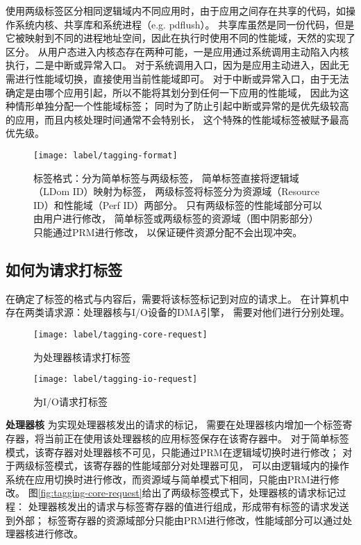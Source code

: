使用两级标签区分相同逻辑域内不同应用时，由于应用之间存在共享的代码，如操作系统内核、共享库和系统进程（e.g. pdflush）。
共享库虽然是同一份代码，但是它被映射到不同的进程地址空间，因此在执行时使用不同的性能域，天然的实现了区分。
从用户态进入内核态存在两种可能，一是应用通过系统调用主动陷入内核执行，二是中断或异常入口。
对于系统调用入口，因为是应用主动进入，因此无需进行性能域切换，直接使用当前性能域即可。
对于中断或异常入口，由于无法确定是由哪个应用引起，所以不能将其划分到任何一下应用的性能域，
因此为这种情形单独分配一个性能域标签；
同时为了防止引起中断或异常的是优先级较高的应用，而且内核处理时间通常不会特别长，
这个特殊的性能域标签被赋予最高优先级。


\begin{figure}[htb]
  \centering
  \texttt{[image: label/tagging-format]}
  \caption[标签格式]{标签格式：分为简单标签与两级标签，
    简单标签直接将逻辑域（LDom ID）映射为标签，
    两级标签将标签分为资源域（Resource ID）和性能域（Perf ID）两部分。
    只有两级标签的性能域部分可以由用户进行修改，
    简单标签或两级标签的资源域（图中阴影部分）只能通过PRM进行修改，
    以保证硬件资源分配不会出现冲突。}
  \label{fig:tagging-format}
\end{figure}

\subsection{如何为请求打标签}
\label{chap:labeladdrspace:tagging}
在确定了标签的格式与内容后，需要将该标签标记到对应的请求上。
在计算机中存在两类请求源：处理器核与I/O设备的DMA引擎，
需要对他们进行分别处理。

\begin{figure}[tb]
\begin{minipage}{0.48\textwidth}
  \centering
  \texttt{[image: label/tagging-core-request]}
  \caption{为处理器核请求打标签}
  \label{fig:tagging-core-request}
\end{minipage}\hfill
\begin{minipage}{0.48\textwidth}
  \centering
  \texttt{[image: label/tagging-io-request]}
  \caption{为I/O请求打标签}
  \label{fig:tagging-io-request}
\end{minipage}
\end{figure}

\textbf{处理器核}\quad
为实现处理器核发出的请求的标记，
需要在处理器核内增加一个标签寄存器，将当前正在使用该处理器核的应用标签保存在该寄存器中。
对于简单标签模式，该寄存器对处理器核不可见，只能通过PRM在逻辑域切换时进行修改；
对于两级标签模式，该寄存器的性能域部分对处理器可见，
可以由逻辑域内的操作系统在应用切换时进行修改，而资源域与简单模式下相同，只能由PRM进行修改。
图\ref{fig:tagging-core-request}给出了两级标签模式下，处理器核的请求标记过程：
处理器核发出的请求与标签寄存器的值进行组成，形成带有标签的请求发送到外部；
标签寄存器的资源域部分只能由PRM进行修改，性能域部分可以通过处理器核进行修改。

